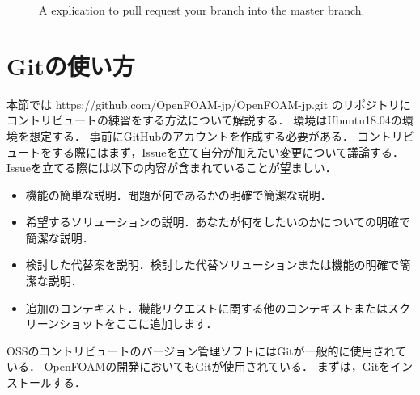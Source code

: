 \documentclass{ltjoc}
\begin{document}
\begin{figure}[htbp]
\centering
{}
\caption{A explication to pull request your branch into the master branch.}
\label{fig:f4f5}
\end{figure}


\section{Gitの使い方}
本節では https://github.com/OpenFOAM-jp/OpenFOAM-jp.git 
のリポジトリにコントリビュートの練習をする方法について解説する．
環境はUbuntu18.04の環境を想定する．
事前に{GitHub}のアカウントを作成する必要がある．
コントリビュートをする際にはまず，Issueを立て自分が加えたい変更について議論する．
Issueを立てる際には以下の内容が含まれていることが望ましい．
\begin{itemize}
  \item 機能の簡単な説明．問題が何であるかの明確で簡潔な説明．
  \item 希望するソリューションの説明．あなたが何をしたいのかについての明確で簡潔な説明．
  \item 検討した代替案を説明．検討した代替ソリューションまたは機能の明確で簡潔な説明．
  \item 追加のコンテキスト．機能リクエストに関する他のコンテキストまたはスクリーンショットをここに追加します．
\end{itemize}
OSSのコントリビュートのバージョン管理ソフトにはGitが一般的に使用されている．
OpenFOAMの開発においてもGitが使用されている．
まずは，Gitをインストールする．
\end{document}
